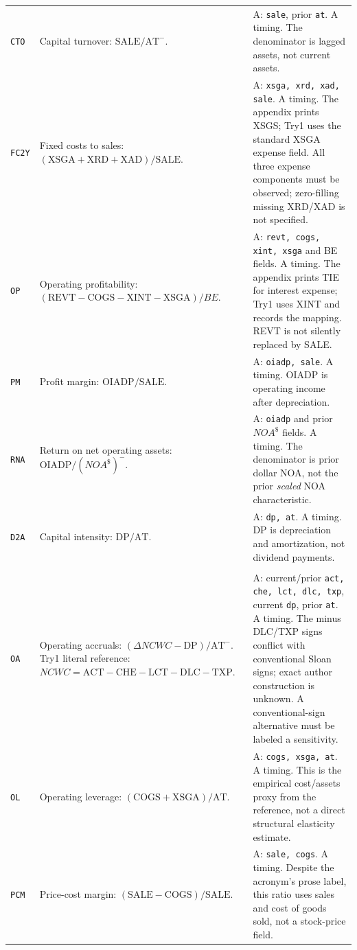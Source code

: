 \documentclass[11pt]{article}
\begin{document}
\begin{longtable}{@{}>{\raggedright\arraybackslash}p{}>{\raggedright\arraybackslash}p{}>{\raggedright\arraybackslash}p{}@{}}
\texttt{CTO} & Capital turnover: $\mathrm{SALE}/\mathrm{AT}^{-}$. & A: \texttt{sale}, prior \texttt{at}. A timing. The denominator is lagged assets, not current assets. \\
\texttt{FC2Y} & Fixed costs to sales: $(\mathrm{XSGA}+\mathrm{XRD}+\mathrm{XAD})/\mathrm{SALE}$. & A: \texttt{xsga, xrd, xad, sale}. A timing. The appendix prints XSGS; Try1 uses the standard XSGA expense field. All three expense components must be observed; zero-filling missing XRD/XAD is not specified. \\
\texttt{OP} & Operating profitability: $(\mathrm{REVT}-\mathrm{COGS}-\mathrm{XINT}-\mathrm{XSGA})/BE$. & A: \texttt{revt, cogs, xint, xsga} and BE fields. A timing. The appendix prints TIE for interest expense; Try1 uses XINT and records the mapping. REVT is not silently replaced by SALE. \\
\texttt{PM} & Profit margin: $\mathrm{OIADP}/\mathrm{SALE}$. & A: \texttt{oiadp, sale}. A timing. OIADP is operating income after depreciation. \\
\texttt{RNA} & Return on net operating assets: $\mathrm{OIADP}/(NOA^{\$})^{-}$. & A: \texttt{oiadp} and prior $NOA^{\$}$ fields. A timing. The denominator is prior dollar NOA, not the prior \emph{scaled} NOA characteristic. \\
\texttt{D2A} & Capital intensity: $\mathrm{DP}/\mathrm{AT}$. & A: \texttt{dp, at}. A timing. DP is depreciation and amortization, not dividend payments. \\
\addlinespace
\multicolumn{3}{@{}l}{\textbf{Intangibles: 3 characteristics}} \\*
\addlinespace
\texttt{OA} & Operating accruals: $(\Delta NCWC-\mathrm{DP})/\mathrm{AT}^{-}$. Try1 literal reference: $NCWC=\mathrm{ACT}-\mathrm{CHE}-\mathrm{LCT}-\mathrm{DLC}-\mathrm{TXP}$. & A: current/prior \texttt{act, che, lct, dlc, txp}, current \texttt{dp}, prior \texttt{at}. A timing. The minus DLC/TXP signs conflict with conventional Sloan signs; exact author construction is unknown. A conventional-sign alternative must be labeled a sensitivity. \\
\texttt{OL} & Operating leverage: $(\mathrm{COGS}+\mathrm{XSGA})/\mathrm{AT}$. & A: \texttt{cogs, xsga, at}. A timing. This is the empirical cost/assets proxy from the reference, not a direct structural elasticity estimate. \\
\texttt{PCM} & Price-cost margin: $(\mathrm{SALE}-\mathrm{COGS})/\mathrm{SALE}$. & A: \texttt{sale, cogs}. A timing. Despite the acronym's prose label, this ratio uses sales and cost of goods sold, not a stock-price field. \\
\end{longtable}
\endgroup
\end{document}
